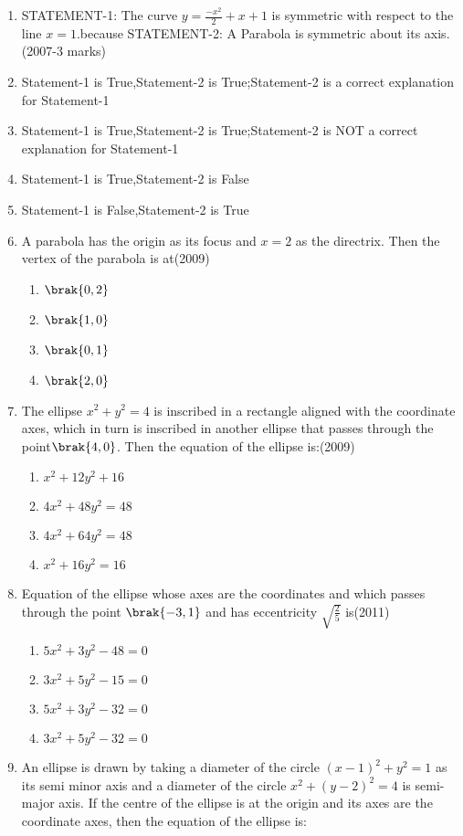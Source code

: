 	\begin{enumerate}

\item STATEMENT-1: The curve $y=\frac{-x^2}{2}+x+1$ is symmetric with respect to the line $x=1$.because
STATEMENT-2: A Parabola is symmetric about its axis.
\hfill(2007-3 marks)
    \item Statement-1 is True,Statement-2 is True;Statement-2 is a correct explanation for Statement-1\item  Statement-1 is True,Statement-2 is True;Statement-2 is NOT a correct explanation for Statement-1\item Statement-1 is True,Statement-2 is False\item Statement-1 is False,Statement-2 is True
\item A parabola has the origin as its focus and $x=2$ as the directrix. Then the vertex of the parabola is at\hfill(2009)
\begin{enumerate}
    \item $\brak{0,2}$
    \item $\brak{1,0}$
    \item $\brak{0,1}$
    \item $\brak{2,0}$
\end{enumerate}
\item The ellipse $x^2+y^2 = 4$ is inscribed in a rectangle aligned with the coordinate axes, which in turn is inscribed in another ellipse that passes through the point$\brak{4,0}$. Then the equation of the ellipse is:\hfill(2009)
\begin{enumerate}
    \item $x^2+12y^2+16$
    \item $4x^2+48y^2=48$
    \item $4x^2+64y^2=48$
    \item $x^2+16y^2=16$
\end{enumerate}
\item Equation of the ellipse whose axes are the coordinates and which passes through the point $\brak{-3,1}$ and has eccentricity $\sqrt{\frac{2}{5}}$ is\hfill(2011)
\begin{enumerate}
    \item $5x^2+3y^2-48=0$
    \item $3x^2+5y^2-15=0$
    \item $5x^2+3y^2-32=0$
    \item $3x^2+5y^2-32=0$
\end{enumerate}
\item An ellipse is drawn by taking a diameter of the circle $(x-1)^2+y^2=1$ as its semi minor axis and a diameter of the circle $x^2+(y-2)^2=4$ is semi-major axis. If the centre of the ellipse is at the origin and its axes are the coordinate axes, then the equation of the ellipse is: 


\end{enumerate}

